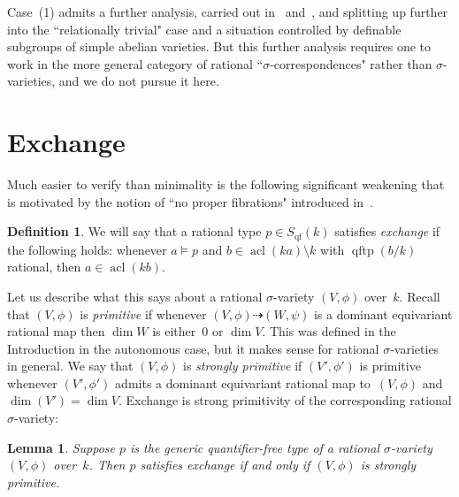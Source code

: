 \documentclass[\DocOpts]{amsart}
\newtheorem{lemma}[theorem]{Lemma}
\theoremstyle{definition}
\newtheorem{definition}[theorem]{Definition}
\def\qftp{\operatorname{qftp}}
\def\qf{\operatorname{qf}}
\def\acl{\operatorname{acl}}
\newcommand{\<}{\langle}
\renewcommand{\>}{\rangle}
\newcommand{\dto}{\dashrightarrow}
\begin{document}
Case~(1) admits a further analysis, carried out in~\cite[$\S$5.12]{acfa} and~\cite[$\S$4.1]{mm}, and splitting up further into the ``relationally trivial" case and a situation controlled by definable subgroups of simple abelian varieties.
But this further analysis requires one to work in the more general category of rational ``$\sigma$-correspondences" rather than $\sigma$-varieties, and we do not pursue it here.


\bigskip
\section{Exchange}
\label{sec:x}

\noindent
Much easier to verify than minimality is the following significant weakening that is motivated by the notion of ``no proper fibrations" introduced in~\cite{moosa-pillay2014}.

\begin{definition}
We will say that a rational type $p\in S_{\qf}(k)$ satisfies \emph{exchange} if the following holds: whenever $a\models p$ and $b\in\acl(ka)\setminus k$ with $\qftp(b/k)$ rational, then $a\in\acl(kb)$.
\end{definition}

Let us describe what this says about a rational $\sigma$-variety $(V,\phi)$ over~$k$.
Recall that $(V,\phi)$ is {\em primitive} if  whenever $(V,\phi)\dto(W,\psi)$ is a dominant equivariant rational map then $\dim W$ is either~$0$ or $\dim V$.
This was defined in the Introduction in the autonomous case, but it makes sense for rational $\sigma$-varieties in general.
We say that 
$(V,\phi)$ is {\em strongly primitive} if $(V',\phi')$ is primitive whenever $(V',\phi')$ admits a dominant equivariant rational map to~$(V,\phi)$ and $\dim(V')=\dim V$.
Exchange is strong primitivity of the corresponding rational $\sigma$-variety:

\begin{lemma}
\label{exchange-geom}
Suppose $p$ is the generic quantifier-free type of a rational $\sigma$-variety $(V,\phi)$ over~$k$.
Then $p$ satisfies exchange if and only if $(V,\phi)$ is strongly primitive.
\end{lemma}
\end{document}
